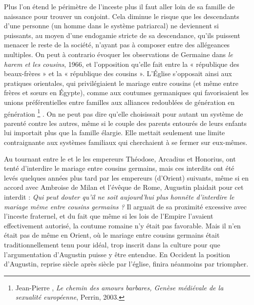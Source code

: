  Plus l'on étend le périmètre de l'inceste plus il faut aller loin de sa famille de naissance pour trouver un conjoint. Cela diminue le risque que les descendants d'une personne (un homme dans le système patriarcal) ne deviennent si puissants, au moyen d'une endogamie stricte de sa descendance, qu'ils puissent menacer le reste de la société, n'ayant pas à composer entre des allégeances multiples. On peut à contrario évoquer les observations de Germaine  dans \emph{le harem et les cousins}, 1966, et l'opposition qu'elle fait entre la « république des beaux-frères » et la « république des cousins ». L'Église s'opposait ainsi aux pratiques orientales, qui privilégiaient le mariage entre cousins (et même entre frères et sœurs en Égypte), comme aux coutumes germaniques qui favorisaient les unions préférentielles entre familles aux alliances redoublées de génération en génération%
\footnote{Jean-Pierre , \emph{Le chemin des amours barbares, Genèse médiévale de la sexualité européenne}, Perrin, 2003.}%
. On ne peut pas dire qu'elle choisissait pour autant un système de parenté contre les autres, même si le couple des parents entourés de leurs enfants lui importait plus que la famille élargie. Elle mettait seulement une limite contraignante aux systèmes familiaux qui cherchaient à se fermer sur eux-mêmes.

 Au tournant entre le  et le  les empereurs Théodose, Arcadius et Honorius, ont tenté d'interdire le mariage entre cousins germains, mais ces interdits ont été levés quelques années plus tard par les empereurs (d'Orient) suivants, même si en accord avec Ambroise de Milan et l'évêque de Rome, Augustin plaidait pour cet interdit : \emph{Qui peut douter qu'il ne soit aujourd'hui plus honnête d'interdire le mariage même entre cousins germains ?} Il arguait de sa proximité excessive avec l'inceste fraternel, et du fait que même si les lois de l'Empire l'avaient effectivement autorisé, la coutume romaine n'y était pas favorable. Mais il n'en était pas de même en Orient, où le mariage entre cousins germains était traditionnellement tenu pour idéal, trop inscrit dans la culture pour que l'argumentation d'Augustin puisse y être entendue. En Occident la position d'Augustin, reprise siècle après siècle par l'église, finira néanmoins par triompher.

